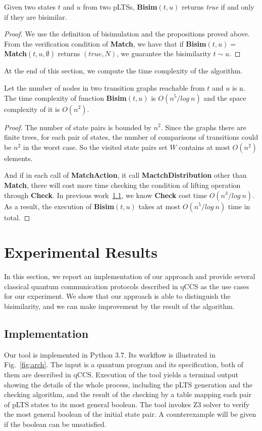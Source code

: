 \documentclass[a4paper,UKenglish,cleveref, autoref]{lipics-v2019}
\begin{document}
\begin{theorem}[Correctness]

Given two states $t$ and $u$ from two pLTSs, \textbf{Bisim}$(t,u)$ returns \textit{true} if and only if they are bisimilar.
\end{theorem} 
\begin{proof}
We use the definition of bisimulation and the propositions proved above. From the verification condition of \textbf{Match}, we have that if
\textbf{Bisim}$(t,u)=$\textbf{Match}$(t,u,\emptyset)$ 
returns $(true, N)$, we guarantee the bisimilarity $t\sim u$.
\end{proof}

At the end of this section, we compute the time complexity of the algorithm.

\begin{theorem}[Complexity]
Let the number of nodes in two transition graphs reachable from $t$ and $u$ is n. The time complexity of function \textbf{Bisim}$(t,u)$ is $O(n^5/log\ n)$ and the space complexity of it is $O(n^2)$.
\end{theorem}
\begin{proof}
 The number of state pairs is bounded by $n^2$. Since the graphs there are finite trees, for each pair of states, the number of comparisons of transitions could be $n^2$ in the worst case. So the visited state pairs set $W$ contains at most $O(n^2)$ elements.

And if in each call of \textbf{MatchAction}, it call \textbf{MactchDistribution} other than \textbf{Match}, there will cost more time checking the condition of lifting operation through \textbf{Check}. In previous work~\ref{}, we know \textbf{Check} cost time $O(n^3/log\ n)$. As a result, the execution of \textbf{Bisim}$(t,u)$ takes at most $O(n^5/log\ n)$ time in total.
\end{proof}

\section{Experimental Results}
In this section, we report an implementation of our approach and provide several classical quantum communication protocols described in qCCS as the use cases for our experiment. We show that our approach is able to distinguish the bisimilarity, and we can make improvement by the result of the algorithm.
\subsection{Implementation}
Our tool is implemented in Python 3.7. Its workflow is illustrated in Fig.~\ref{fig:arch}. The input is a quantum program and its specification, both of them are described in qCCS. Execution of the tool yields a terminal output showing the details of the whole process, including the pLTS generation and the checking algorithm, and the result of the checking by a table mapping each pair of pLTS states to its most general boolean. The tool invokes Z3 solver to verify the most general boolean of the initial state pair. A counterexample will be given if the boolean can be unsatisfied.
\end{document}
